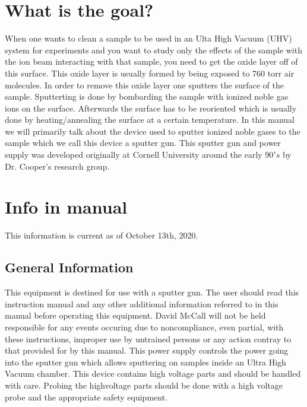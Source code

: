 \documentclass[11pt,a4paper]{report}
\begin{document}
\section{What is the goal?}
When one wants to clean a sample to be used in an Ulta High Vacuum (UHV) system for experiments and you want to study only the effects of the sample with the ion beam interacting with that sample, you need to get the oxide layer off of this surface. This oxide layer is usually formed by being exposed to 760 torr air molecules. In order to remove this oxide layer one sputters the surface of the sample. Sputterting is done by bombarding the sample with  ionized noble gas ions on the surface. Afterwards the surface has to be reoriented which is usually done by heating/annealing the surface at a certain temperature. In this manual we will primarily talk about the device used to sputter ionized noble gases to the sample which we call this device a sputter gun. This sputter gun and power supply was developed originally at Cornell University around the early $90's$ by Dr. Cooper's research group.   

\section{Info in manual}
This information is current as of October 13th, 2020.

\subsection{General Information}
This equipment is destined for use with a sputter gun. The user should read this instruction manual and any other additional information referred to in this manual before operating this equipment. David McCall will not be held responsible for any events occuring due to noncompliance, even partial, with these instructions, improper use by untrained persons or any action contray to that provided for by this manual. This power supply controls the power going into the sputter gun which allows sputtering on samples inside an Ultra High Vacuum chamber. This device contains high voltage parts and should be handled with care. Probing the highvoltage parts should be done with a high voltage probe and the appropriate safety equipment.
\end{document}
